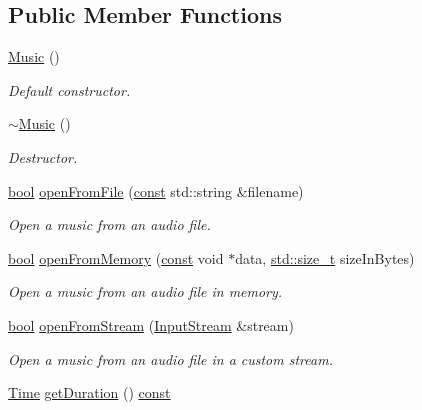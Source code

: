\subsection*{Public Member Functions}
\begin{DoxyCompactItemize}
\item 
\hyperlink{classsf_1_1_music_a0bc787d8e022b3a9b89cf2c28befd42e}{Music} ()
\begin{DoxyCompactList}\small\item\em Default constructor. \end{DoxyCompactList}\item 
\hyperlink{classsf_1_1_music_a4c65860fed2f01d0eaa6c4199870414b}{$\sim$\-Music} ()
\begin{DoxyCompactList}\small\item\em Destructor. \end{DoxyCompactList}\item 
\hyperlink{term__entry_8h_a002004ba5d663f149f6c38064926abac}{bool} \hyperlink{classsf_1_1_music_a3edc66e5f5b3f11e84b90eaec9c7d7c0}{open\-From\-File} (\hyperlink{term__entry_8h_a57bd63ce7f9a353488880e3de6692d5a}{const} std\-::string \&filename)
\begin{DoxyCompactList}\small\item\em Open a music from an audio file. \end{DoxyCompactList}\item 
\hyperlink{term__entry_8h_a002004ba5d663f149f6c38064926abac}{bool} \hyperlink{classsf_1_1_music_ae93b21bcf28ff0b5fec458039111386e}{open\-From\-Memory} (\hyperlink{term__entry_8h_a57bd63ce7f9a353488880e3de6692d5a}{const} void $\ast$data, \hyperlink{nc__alloc_8h_a7b60c5629e55e8ec87a4547dd4abced4}{std\-::size\-\_\-t} size\-In\-Bytes)
\begin{DoxyCompactList}\small\item\em Open a music from an audio file in memory. \end{DoxyCompactList}\item 
\hyperlink{term__entry_8h_a002004ba5d663f149f6c38064926abac}{bool} \hyperlink{classsf_1_1_music_a4e55d1910a26858b44778c26b237d673}{open\-From\-Stream} (\hyperlink{classsf_1_1_input_stream}{Input\-Stream} \&stream)
\begin{DoxyCompactList}\small\item\em Open a music from an audio file in a custom stream. \end{DoxyCompactList}\item 
\hyperlink{classsf_1_1_time}{Time} \hyperlink{classsf_1_1_music_af4738b69c4c5038f71414ad7ffbbdc2b}{get\-Duration} () \hyperlink{term__entry_8h_a57bd63ce7f9a353488880e3de6692d5a}{const} 

\end{DoxyCompactItemize}
